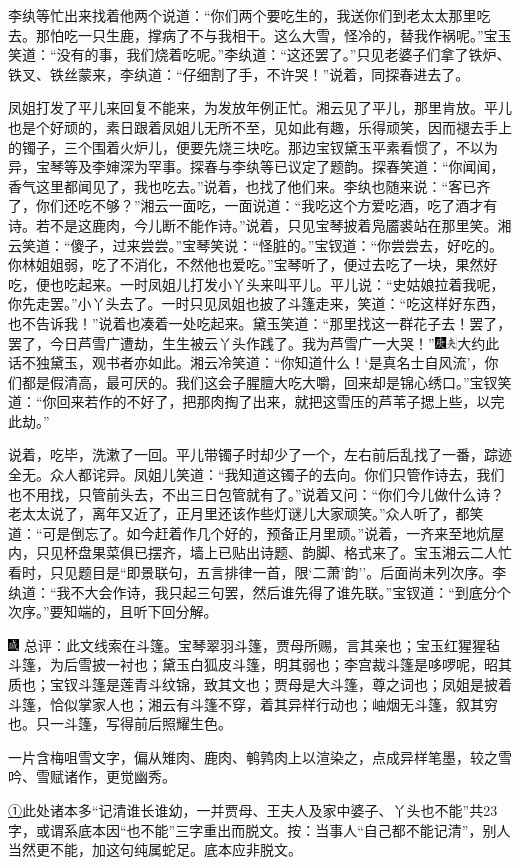 李纨等忙出来找着他两个说道：``你们两个要吃生的，我送你们到老太太那里吃去。那怕吃一只生鹿，撑病了不与我相干。这么大雪，怪冷的，替我作祸呢。''宝玉笑道：``没有的事，我们烧着吃呢。''李纨道：``这还罢了。''只见老婆子们拿了铁炉、铁叉、铁丝蒙来，李纨道：``仔细割了手，不许哭！''说着，同探春进去了。

凤姐打发了平儿来回复不能来，为发放年例正忙。湘云见了平儿，那里肯放。平儿也是个好顽的，素日跟着凤姐儿无所不至，见如此有趣，乐得顽笑，因而褪去手上的镯子，三个围着火炉儿，便要先烧三块吃。那边宝钗黛玉平素看惯了，不以为异，宝琴等及李婶深为罕事。探春与李纨等已议定了题韵。探春笑道：``你闻闻，香气这里都闻见了，我也吃去。''说着，也找了他们来。李纨也随来说：``客已齐了，你们还吃不够？''湘云一面吃，一面说道：``我吃这个方爱吃酒，吃了酒才有诗。若不是这鹿肉，今儿断不能作诗。''说着，只见宝琴披着凫靥裘站在那里笑。湘云笑道：``傻子，过来尝尝。''宝琴笑说：``怪脏的。''宝钗道：``你尝尝去，好吃的。你林姐姐弱，吃了不消化，不然他也爱吃。''宝琴听了，便过去吃了一块，果然好吃，便也吃起来。一时凤姐儿打发小丫头来叫平儿。平儿说：``史姑娘拉着我呢，你先走罢。''小丫头去了。一时只见凤姐也披了斗篷走来，笑道：``吃这样好东西，也不告诉我！''说着也凑着一处吃起来。黛玉笑道：``那里找这一群花子去！罢了，罢了，今日芦雪广遭劫，生生被云丫头作践了。我为芦雪广一大哭！''{\includegraphics[width=3mm]{../Images/00004}\includegraphics[width=3mm]{../Images/00012}\footnotesize \kaishu 大约此话不独黛玉，观书者亦如此。}湘云冷笑道：``你知道什么！`是真名士自风流'，你们都是假清高，最可厌的。我们这会子腥膻大吃大嚼，回来却是锦心绣口。''宝钗笑道：``你回来若作的不好了，把那肉掏了出来，就把这雪压的芦苇子揌上些，以完此劫。''

说着，吃毕，洗漱了一回。平儿带镯子时却少了一个，左右前后乱找了一番，踪迹全无。众人都诧异。凤姐儿笑道：``我知道这镯子的去向。你们只管作诗去，我们也不用找，只管前头去，不出三日包管就有了。''说着又问：``你们今儿做什么诗？老太太说了，离年又近了，正月里还该作些灯谜儿大家顽笑。''众人听了，都笑道：``可是倒忘了。如今赶着作几个好的，预备正月里顽。''说着，一齐来至地炕屋内，只见杯盘果菜俱已摆齐，墙上已贴出诗题、韵脚、格式来了。宝玉湘云二人忙看时，只见题目是``即景联句，五言排律一首，限`二萧'韵''。后面尚未列次序。李纨道：``我不大会作诗，我只起三句罢，然后谁先得了谁先联。''宝钗道：``到底分个次序。''要知端的，且听下回分解。

{\includegraphics[width=3mm]{../Images/00005}  \kaishu 总评：此文线索在斗篷。宝琴翠羽斗篷，贾母所赐，言其亲也；宝玉红猩猩毡斗篷，为后雪披一衬也；黛玉白狐皮斗篷，明其弱也；李宫裁斗篷是哆}啰{呢，昭其质也；宝钗斗篷是莲青斗纹锦，致其文也；贾母是大斗篷，尊之词也；凤姐是披着斗篷，恰似掌家人也；湘云有斗篷不穿，着其异样行动也；岫烟无斗篷，叙其穷也。只一斗篷，写得前后照耀生色。}

{一片含梅咀雪文字，偏从雉肉、鹿肉、鹌鹑肉上以渲染之，点成异样笔墨，较之雪吟、雪赋诸作，更觉幽秀。}

{\href{../Text/part0053_split_000.html\#navto_1_a}{①}此处诸本多``记清谁长谁幼，一并贾母、王夫人及家中婆子、丫头也不能''共23字，或谓系底本因``也不能''三字重出而脱文。按：当事人``自己都不能记清''，别人当然更不能，加这句纯属蛇足。底本应非脱文。}
